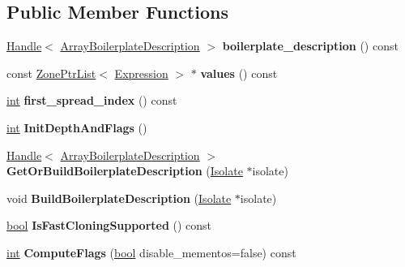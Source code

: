 \subsection*{Public Member Functions}
\begin{DoxyCompactItemize}
\item 
\mbox{\label{classv8_1_1internal_1_1ArrayLiteral_a4eefadce75cca76430e9c48b13889b12}} 
\mbox{\hyperlink{classv8_1_1internal_1_1Handle}{Handle}}$<$ \mbox{\hyperlink{classv8_1_1internal_1_1ArrayBoilerplateDescription}{Array\+Boilerplate\+Description}} $>$ {\bfseries boilerplate\+\_\+description} () const
\item 
\mbox{\label{classv8_1_1internal_1_1ArrayLiteral_a83cb15e8be73543b31b69ed1843f8fa1}} 
const \mbox{\hyperlink{classv8_1_1internal_1_1ZoneList}{Zone\+Ptr\+List}}$<$ \mbox{\hyperlink{classv8_1_1internal_1_1Expression}{Expression}} $>$ $\ast$ {\bfseries values} () const
\item 
\mbox{\label{classv8_1_1internal_1_1ArrayLiteral_a5863a0bfbbb1fc299badf8cdf86b9c42}} 
\mbox{\hyperlink{classint}{int}} {\bfseries first\+\_\+spread\+\_\+index} () const
\item 
\mbox{\label{classv8_1_1internal_1_1ArrayLiteral_a4626022be962f75b4d822439af97f3b5}} 
\mbox{\hyperlink{classint}{int}} {\bfseries Init\+Depth\+And\+Flags} ()
\item 
\mbox{\label{classv8_1_1internal_1_1ArrayLiteral_afb05b5f39aa256b00a59aa417e94fbb6}} 
\mbox{\hyperlink{classv8_1_1internal_1_1Handle}{Handle}}$<$ \mbox{\hyperlink{classv8_1_1internal_1_1ArrayBoilerplateDescription}{Array\+Boilerplate\+Description}} $>$ {\bfseries Get\+Or\+Build\+Boilerplate\+Description} (\mbox{\hyperlink{classv8_1_1internal_1_1Isolate}{Isolate}} $\ast$isolate)
\item 
\mbox{\label{classv8_1_1internal_1_1ArrayLiteral_a5131fe3e0aeb17d8f0574697a4e3cbc5}} 
void {\bfseries Build\+Boilerplate\+Description} (\mbox{\hyperlink{classv8_1_1internal_1_1Isolate}{Isolate}} $\ast$isolate)
\item 
\mbox{\label{classv8_1_1internal_1_1ArrayLiteral_ad7aba46f862398dfc3c4c049032eb5a6}} 
\mbox{\hyperlink{classbool}{bool}} {\bfseries Is\+Fast\+Cloning\+Supported} () const
\item 
\mbox{\label{classv8_1_1internal_1_1ArrayLiteral_a86647520c2f34a7a3ca58fafc261de38}} 
\mbox{\hyperlink{classint}{int}} {\bfseries Compute\+Flags} (\mbox{\hyperlink{classbool}{bool}} disable\+\_\+mementos=false) const
\end{DoxyCompactItemize}
